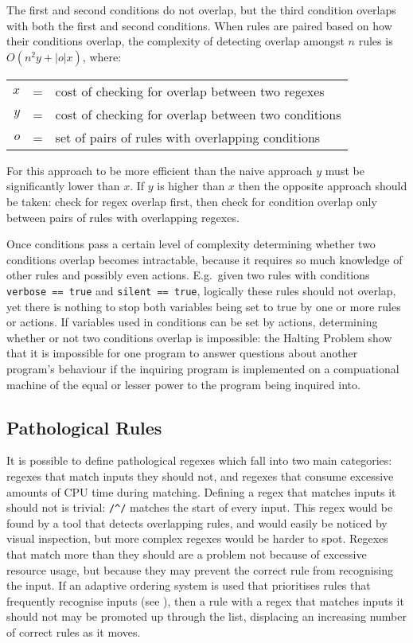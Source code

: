 \noindent{}The first and second conditions do not overlap, but the third
condition overlaps with both the first and second conditions.  When rules
are paired based on how their conditions overlap, the complexity of
detecting overlap amongst $n$ rules is $O\left(n^{2}y+|o|x\right)$, where:

\begin{tabular}[]{rcl}

    $x$ & = & cost of checking for overlap between two regexes    \\
    $y$ & = & cost of checking for overlap between two conditions \\
    $o$ & = & set of pairs of rules with overlapping conditions   \\

\end{tabular}

For this approach to be more efficient than the naive approach $y$ must be
significantly lower than $x$.  If $y$ is higher than $x$ then the opposite
approach should be taken: check for regex overlap first, then check
for condition overlap only between pairs of rules with overlapping regexes.

Once conditions pass a certain level of complexity determining whether two
conditions overlap becomes intractable, because it requires so much
knowledge of other rules and possibly even actions.  E.g.\ given two rules
with conditions \verb!verbose == true! and \verb!silent == true!, logically
these rules should not overlap, yet there is nothing to stop both variables
being set to true by one or more rules or actions.  If variables used in
conditions can be set by actions, determining whether or not two conditions
overlap is impossible: the Halting Problem show that it is impossible for
one program to answer questions about another program's behaviour if the
inquiring program is implemented on a compuational machine of the equal or
lesser power to the program being inquired into.

\subsection{Pathological Rules}

It is possible to define pathological regexes which fall into two main
categories: regexes that match inputs they should not, and regexes that
consume excessive amounts of CPU time during matching.  Defining a regex
that matches inputs it should not is trivial: \verb!/^/! matches the start
of every input.  This regex would be found by a tool that detects
overlapping rules, and would easily be noticed by visual inspection, but
more complex regexes would be harder to spot.  Regexes that match more than
they should are a problem not because of excessive resource usage, but
because they may prevent the correct rule from recognising the input.  If
an adaptive ordering system is used that prioritises rules that frequently
recognise inputs (see ), then a
rule with a regex that matches inputs it should not may be promoted up
through the list, displacing an increasing number of correct rules as it
moves.


